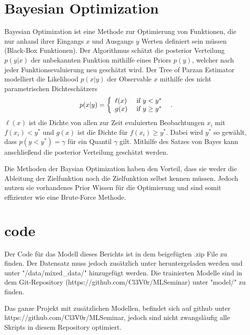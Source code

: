 \chapter{Bayesian Optimization}
\label{sec:TPE}
Bayesian Optimization ist eine Methode zur Optimierung von Funktionen, die nur anhand ihrer Eingangs $x$ und Ausgangs $y$
Werten definiert sein müssen (Black-Box Funktionen). 
Der Algorithmus schätzt die posterior Verteilung $p(y|x)$ der unbekannten Funktion mithilfe eines Priors $p(y)$, welcher 
nach jeder Funktionsevaluierung neu geschätzt wird.
Der Tree of Parzan Estimator modelliert die Likelihood $p(x|y)$ der Observable $x$ mithilfe des nicht parametrischen 
Dichteschätzers 
\begin{equation}
p(x | y)=\left\{\begin{array}{ll}{\ell(x)} & {\text { if } y<y^{*}} \\ {g(x)} & {\text { if } y \geq y^{*}}\end{array}\right. \text{\, .}
\end{equation}
$\ell(x)$ ist die Dichte von allen zur Zeit evaluierten Beobachtungen $x_i$ mit $f(x_i)<y^{*}$ und 
$g(x)$ ist die Dichte für $f(x_i) \geq y^{*}$. 
Dabei wird $y^{*}$ so gewählt, dass $p\left(y<y^{*}\right)=\gamma$ für ein Quantil $\gamma$ gilt.
Mithilfe des Satzes von Bayes kann anschließend die posterior Verteilung geschätzt werden.

Die Methoden der Baysian Optimization haben den Vorteil, dass sie weder die Ableitung der Zielfunktion noch die
Zielfunktion selbst kennen müssen. 
Jedoch nutzen sie vorhandenes Prior Wissen für die Optimierung und sind somit effizienter wie eine Brute-Force Methode.

\chapter{code}
Der Code für das Modell dieses Berichts ist in dem beigefügten .zip File zu finden. 
Der Datensatz muss jedoch zusätzlich unter \cite{real_data} heruntergeladen werden und unter 
"/data/mixed\_data/" hinzugefügt werden. 
Die trainierten Modelle sind in dem Git-Repository (https://github.com/Cl3V0r/MLSeminar) unter "model/" zu finden.

Das ganze Projekt mit zusätzlichen Modellen, befindet sich auf github unter https://github.com/Cl3V0r/MLSeminar,
jedoch sind nicht zwangsläufig alle Skripts in diesem Repository optimiert.
